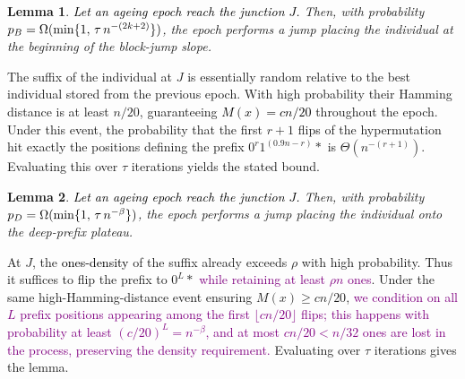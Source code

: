 \documentclass[lettersize,journal]{IEEEtran}
\newcommand{\new}[1]{\textcolor{black}{#1}}
\newcommand{\rerev}[1]{\textcolor{purple}{#1}}
\newtheorem{lemma}{Lemma}
\begin{document}
\begin{lemma} \label{lem:BJO-epoch}
	\textcolor{black}{Let an ageing epoch reach the junction $J$.} Then, with probability $\new{p_B}=\Omega(\min\{1,\,\tau\,n^{-(2k+2)}\})$, the epoch performs a jump placing the individual at the beginning of the block-jump slope.
\end{lemma}

The suffix of the individual at $J$ is essentially random relative to the best individual stored from the 
previous epoch. 
With high probability their Hamming distance is at least $n/20$, guaranteeing 
\textcolor{black}{$M(x)= cn/20$} throughout the epoch.  
Under this event, the probability that the first $r+1$ flips of the hypermutation hit exactly the positions defining the prefix $0^{r}1^{(0.9n-r)} *$ is $\Theta(n^{-(r+1)})$.
Evaluating this over $\tau$ iterations yields the stated bound.





\begin{lemma} \label{lem:DPO-epoch}
	\textcolor{black}{Let an ageing epoch reach the junction $J$.} Then, with probability $\new{p_D}=\Omega(\min\{1,\,\tau\,n^{-\beta}\})$, the epoch performs a jump placing the individual onto the deep-prefix plateau.
\end{lemma}

At $J$, the \textcolor{black}{ones-density} of the suffix already exceeds $\rho$ with high probability.
Thus it suffices to flip the prefix to $0^L *$ \rerev{while retaining at least $\rho n$ ones}.
Under the same high-Hamming-distance event ensuring $M(x)\ge cn/20$, \rerev{we condition on all $L$ prefix positions appearing among the first $\lfloor cn/20\rfloor$ flips; this happens with probability at least $(c/20)^L = n^{-\beta}$, and at most $cn/20 < n/32$ ones are lost in the process, preserving the density requirement.}
Evaluating over $\tau$ iterations gives the lemma.
\end{document}

